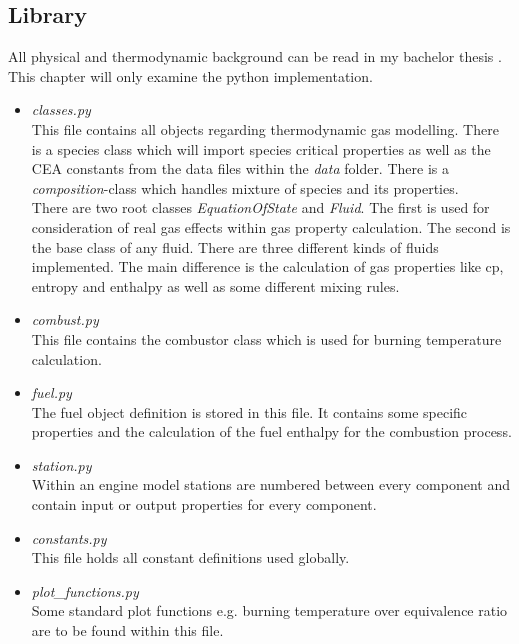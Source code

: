 \documentclass{article}
\begin{document}
    \subsection{Library}
        All physical and thermodynamic background can be read in my bachelor thesis \cite{Bachelor}. This chapter will only examine the python implementation. 
        \begin{itemize}
            \item \textit{classes.py}\\
                This file contains all objects regarding thermodynamic gas modelling. There is a species class which will import species critical properties as well as the CEA constants from the data files within the \textit{data} folder. There is a \textit{composition}-class which handles mixture of species and its properties.\\
                There are two root classes \textit{EquationOfState} and \textit{Fluid}. The first is used for consideration of real gas effects within gas property calculation. The second is the base class of any fluid. There are three different kinds of fluids implemented. The main difference is the calculation of gas properties like cp, entropy and enthalpy as well as some different mixing rules.
            \item \textit{combust.py}\\
                This file contains the combustor class which is used for burning temperature calculation.
            \item \textit{fuel.py}\\    
                The fuel object definition is stored in this file. It contains some specific properties and the calculation of the fuel enthalpy for the combustion process.
            \item \textit{station.py}\\
                Within an engine model stations are numbered between every component and contain input or output properties for every component.
            \item \textit{constants.py}\\
                This file holds all constant definitions used globally.
            \item \textit{plot\_functions.py}\\
                Some standard plot functions e.g. burning temperature over equivalence ratio are to be found within this file.
        \end{itemize}
\end{document}
